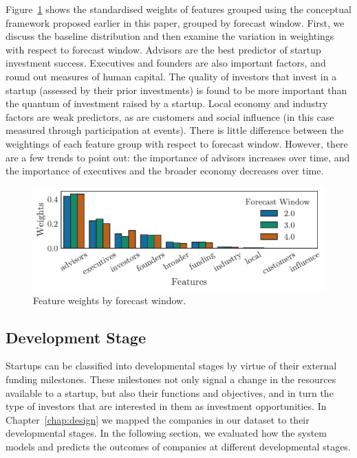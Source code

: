 \documentclass[../thesis/thesis.tex]{subfiles}
\begin{document}
Figure~\ref{fig:evaluation:features_window} shows the standardised weights of features grouped using the conceptual framework proposed earlier in this paper, grouped by forecast window. First, we discuss the baseline distribution and then examine the variation in weightings with respect to forecast window. Advisors are the best predictor of startup investment success. Executives and founders are also important factors, and round out measures of human capital. The quality of investors that invest in a startup (assessed by their prior investments) is found to be more important than the quantum of investment raised by a startup. Local economy and industry factors are weak predictors, as are customers and social influence (in this case measured through participation at events). There is little difference between the weightings of each feature group with respect to forecast window. However, there are a few trends to point out: the importance of advisors increases over time, and the importance of executives and the broader economy decreases over time.

\begin{figure}[!htb]
    \centering
    \includegraphics[width=\textwidth]{../figures/evaluation/features_window}
    \caption[Feature weights by forecast window]{Feature weights by forecast window.}
    \label{fig:evaluation:features_window}
\end{figure}

\subsection{Development Stage}

Startups can be classified into developmental stages by virtue of their external funding milestones. These milestones not only signal a change in the resources available to a startup, but also their functions and objectives, and in turn the type of investors that are interested in them as investment opportunities. In Chapter~\ref{chap:design} we mapped the companies in our dataset to their developmental stages. In the following section, we evaluated how the system models and predicts the outcomes of companies at different developmental stages.
\end{document}

